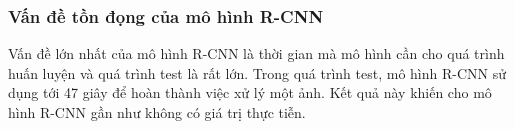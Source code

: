 {    \subsubsection*{Vấn đề tồn đọng của mô hình R-CNN}
    Vấn đề lớn nhất của mô hình R-CNN là thời gian mà mô hình cần cho quá trình huấn luyện và quá trình test là rất lớn.
    Trong quá trình test, mô hình R-CNN sử dụng tới 47 giây để hoàn thành việc xử lý một ảnh.
    Kết quả này khiến cho mô hình R-CNN gần như không có giá trị thực tiễn.
}